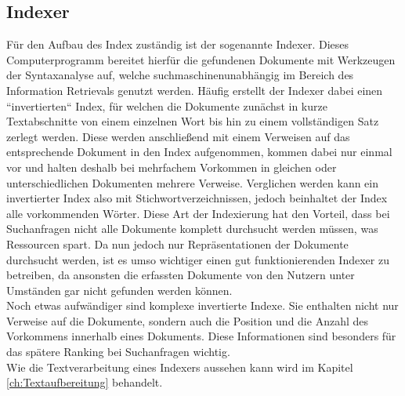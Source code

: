 \subsection{Indexer}
Für den Aufbau des Index zuständig ist der sogenannte Indexer. Dieses Computerprogramm bereitet hierfür die gefundenen Dokumente mit Werkzeugen der Syntaxanalyse auf, welche suchmaschinenunabhängig im Bereich des Information Retrievals genutzt werden. Häufig erstellt der Indexer dabei einen ``invertierten`` Index, für welchen die Dokumente zunächst in kurze Textabschnitte von einem einzelnen Wort bis hin zu einem vollständigen Satz zerlegt werden. Diese werden anschließend mit einem Verweisen auf das entsprechende Dokument in den Index aufgenommen, kommen dabei nur einmal vor und halten deshalb bei mehrfachem Vorkommen in gleichen oder unterschiedlichen Dokumenten mehrere Verweise. Verglichen werden kann ein invertierter Index also mit Stichwortverzeichnissen, jedoch beinhaltet der Index alle vorkommenden Wörter. Diese Art der Indexierung hat den Vorteil, dass bei Suchanfragen nicht alle Dokumente komplett durchsucht werden müssen, was Ressourcen spart. Da nun jedoch nur Repräsentationen der Dokumente durchsucht werden, ist es umso wichtiger einen gut funktionierenden Indexer zu betreiben, da ansonsten die erfassten Dokumente von den Nutzern unter Umständen gar nicht gefunden werden können.\\
Noch etwas aufwändiger sind komplexe invertierte Indexe. Sie enthalten nicht nur Verweise auf die Dokumente, sondern auch die Position und die Anzahl des Vorkommens innerhalb eines Dokuments. Diese Informationen sind besonders für das spätere Ranking bei Suchanfragen wichtig.\cite{suchmverst} \\
Wie die Textverarbeitung eines Indexers aussehen kann wird im Kapitel \ref{ch:Textaufbereitung} behandelt.
